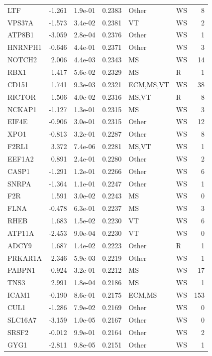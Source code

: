 \begin{table}[ht]
\begin{tabular}{lrlrllr}
  LTF & -1.261 & 1.9e-01 & 0.2383 & Other & WS & 8 \\ 
  VPS37A & -1.573 & 3.4e-02 & 0.2381 & VT & WS & 2 \\ 
  ATP8B1 & -3.059 & 2.8e-04 & 0.2376 & Other & WS & 1 \\ 
  HNRNPH1 & -0.646 & 4.4e-01 & 0.2371 & Other & WS & 3 \\ 
  NOTCH2 & 2.006 & 4.4e-03 & 0.2343 & MS & WS & 14 \\ 
  RBX1 & 1.417 & 5.6e-02 & 0.2329 & MS & R & 1 \\ 
  CD151 & 1.741 & 9.3e-03 & 0.2321 & ECM,MS,VT & WS & 38 \\ 
  RICTOR & 1.506 & 4.0e-02 & 0.2316 & MS,VT & R & 8 \\ 
  NCKAP1 & -1.127 & 1.3e-01 & 0.2315 & MS & WS & 3 \\ 
  EIF4E & -0.906 & 3.0e-01 & 0.2315 & Other & WS & 12 \\ 
  XPO1 & -0.813 & 3.2e-01 & 0.2287 & Other & WS & 8 \\ 
  F2RL1 & 3.372 & 7.4e-06 & 0.2281 & MS,VT & WS & 1 \\ 
  EEF1A2 & 0.891 & 2.4e-01 & 0.2280 & Other & WS & 2 \\ 
  CASP1 & -1.291 & 1.2e-01 & 0.2266 & Other & WS & 6 \\ 
  SNRPA & -1.364 & 1.1e-01 & 0.2247 & Other & WS & 1 \\ 
  F2R & 1.591 & 3.0e-02 & 0.2243 & MS & WS & 0 \\ 
  FLNA & -0.478 & 6.3e-01 & 0.2237 & MS & WS & 3 \\ 
  RHEB & 1.683 & 1.5e-02 & 0.2230 & VT & WS & 6 \\ 
  ATP11A & -2.453 & 9.0e-04 & 0.2230 & VT & WS & 0 \\ 
  ADCY9 & 1.687 & 1.4e-02 & 0.2223 & Other & R & 1 \\ 
  PRKAR1A & 2.346 & 5.9e-03 & 0.2219 & Other & WS & 1 \\ 
  PABPN1 & -0.924 & 3.2e-01 & 0.2212 & MS & WS & 17 \\ 
  TNS3 & 2.991 & 1.8e-04 & 0.2186 & MS & WS & 1 \\ 
  ICAM1 & -0.190 & 8.6e-01 & 0.2175 & ECM,MS & WS & 153 \\ 
  CUL1 & -1.286 & 7.9e-02 & 0.2169 & Other & WS & 0 \\ 
  SLC16A7 & -3.159 & 1.0e-05 & 0.2167 & Other & WS & 0 \\ 
  SRSF2 & -0.012 & 9.9e-01 & 0.2164 & Other & WS & 2 \\ 
  GYG1 & -2.811 & 9.8e-05 & 0.2151 & Other & WS & 1 \\ 

\end{tabular}
\end{table}
